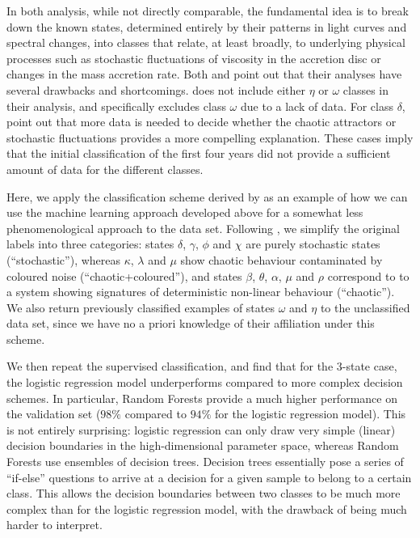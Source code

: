 \documentclass[12pt]{emulateapj}
\begin{document}
In both analysis, while not directly comparable, the fundamental idea is to break down the known states, determined entirely by their patterns in light curves and 
spectral changes, into classes that relate, at least broadly, to underlying physical processes such as stochastic fluctuations of viscosity in the accretion disc or 
changes in the mass accretion rate. Both \citet{harikrishnan2011} and \citet{polyakov2012} point out that their analyses have several drawbacks and shortcomings. 
\citet{harikrishnan2011} does not include either $\eta$ or $\omega$ classes in their analysis, and \citet{polyakov2012} specifically excludes class $\omega$ due to 
a lack of data. For class $\delta$, \citet{polyakov2012} point out that more data is needed to decide whether the chaotic attractors or stochastic fluctuations 
provides a more compelling explanation. These cases imply that the initial classification of the first four years did not provide a sufficient amount of data for the 
different classes. 

Here, we apply the classification scheme derived by \citet{harikrishnan2011} as an example of how we can use the machine learning approach developed above 
for a somewhat less phenomenological approach to the data set. 
Following \citet{harikrishnan2011}, we simplify the original labels into three categories: states $\delta$, $\gamma$, $\phi$ and $\chi$ are purely stochastic states
(``stochastic''), whereas $\kappa$, $\lambda$ and $\mu$ show chaotic behaviour contaminated by coloured noise (``chaotic+coloured''), and states $\beta$, $\theta$, $\alpha$, $\mu$ and $\rho$ correspond to to a system showing signatures of deterministic non-linear behaviour (``chaotic'').
We also return previously classified examples of states $\omega$ and $\eta$ to the unclassified data set, since we have no a priori knowledge of their affiliation under this scheme.

We then repeat the supervised classification, and find that for the 3-state case, the logistic regression model underperforms compared to more complex decision schemes. In particular, Random Forests provide a much higher performance on the validation set ($98\%$ compared to $94\%$ for the logistic regression model). 
This is not entirely surprising: logistic regression can only draw very simple (linear) decision boundaries in the high-dimensional parameter space, whereas Random Forests use ensembles of decision trees. Decision trees essentially pose a series of ``if-else'' questions to arrive at a decision for a given sample to belong to a certain class. This allows the decision boundaries between two classes to be much more complex than for the logistic regression model, with the drawback of being much harder to interpret.
\end{document}
